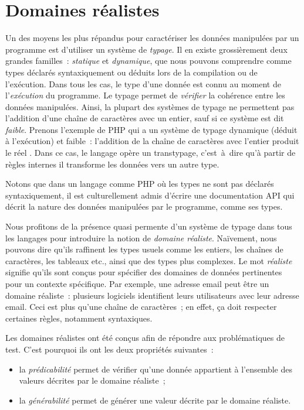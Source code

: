 \section{Domaines réalistes}
\label{section:language:realdoms}

Un des moyens les plus répandus pour caractériser les données manipulées par un
programme est d'utiliser un système de {\em typage}. Il en existe grossièrement
deux grandes familles~: {\em statique} et {\em dynamique}, que nous pouvons
comprendre comme types déclarés syntaxiquement ou déduits lors de la compilation
ou de l'exécution. Dans tous les cas, le type d'une donnée est connu au moment
de l'{\em exécution} du programme. Le typage permet de {\em vérifier} la
cohérence entre les données manipulées. Ainsi, la plupart des systèmes de typage
ne permettent pas l'addition d'une chaîne de caractères avec un entier, sauf si
ce système est dit {\em faible}. Prenons l'exemple de PHP qui a un système de
typage dynamique (déduit à l'exécution) et faible~: l'addition de la chaîne de
caractères  avec l'entier  produit le réel . Dans
ce cas, le langage opère un transtypage, c'est~à~dire qu'à partir de règles
internes il transforme les données vers un autre type.

Notons que dans un langage comme PHP où les types ne sont pas déclarés
syntaxiquement, il est culturellement admis d'écrire une documentation API qui
décrit la nature des données manipulées par le programme, comme ses types.

Nous profitons de la présence quasi permente d'un système de typage dans tous
les langages pour introduire la notion de {\em domaine réaliste}. Naïvement,
nous pouvons dire qu'ils raffinent les types usuels comme les entiers, les
chaînes de caractères, les tableaux etc., ainsi que des types plus complexes. Le
mot {\em réaliste} signifie qu'ils sont conçus pour spécifier des domaines de
données pertinentes pour un contexte spécifique. Par exemple, une adresse email
peut être un domaine réaliste~: plusieurs logiciels identifient leurs
utilisateurs avec leur adresse email. Ceci est plus qu'une chaîne de
caractères~; en effet, ça doit respecter certaines règles, notamment
syntaxiques.

Les domaines réalistes ont été conçus afin de répondre aux problématiques de
test. C'est pourquoi ils ont les deux propriétés suivantes~:

\begin{itemize}

\item la {\em prédicabilité} permet de vérifier qu'une donnée appartient à
l'ensemble des valeurs décrites par le domaine réaliste~;

\item la {\em générabilité} permet de générer une valeur décrite par le domaine
réaliste.

\end{itemize}

